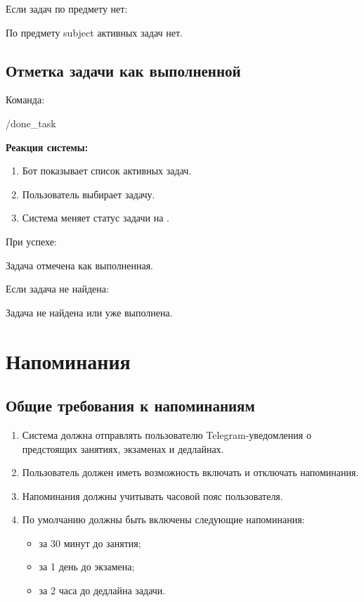 \documentclass[10pt,a4paper,final]{article} %
\begin{document}
Если задач по предмету нет:

\begin{Code}
По предмету {subject} активных задач нет.
\end{Code}

\subsection{Отметка задачи как выполненной}

Команда:

\begin{Code}
/done_task
\end{Code}

\textbf{Реакция системы:}

\begin{enumerate}
    \item Бот показывает список активных задач.
    \item Пользователь выбирает задачу.
    \item Система меняет статус задачи на .
\end{enumerate}

При успехе:

\begin{Code}
Задача отмечена как выполненная.
\end{Code}

Если задача не найдена:

\begin{Code}
Задача не найдена или уже выполнена.
\end{Code}

\section{Напоминания}

\subsection{Общие требования к напоминаниям}

\begin{enumerate}[label=\arabic*.]
    \item Система должна отправлять пользователю Telegram-уведомления о предстоящих занятиях, экзаменах и дедлайнах.
    \item Пользователь должен иметь возможность включать и отключать напоминания.
    \item Напоминания должны учитывать часовой пояс пользователя.
    \item По умолчанию должны быть включены следующие напоминания:
    \begin{itemize}
        \item за 30 минут до занятия;
        \item за 1 день до экзамена;
        \item за 2 часа до дедлайна задачи.
    \end{itemize}
\end{enumerate}
\end{document}
